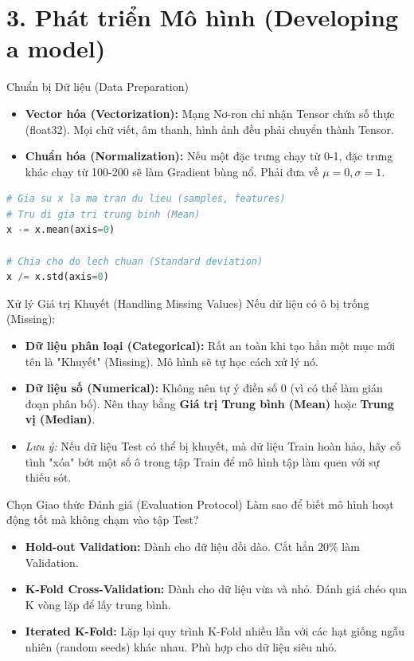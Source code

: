 \documentclass[aspectratio=169]{beamer}
\begin{document}
\section{3. Phát triển Mô hình (Developing a model)}

\begin{frame}[fragile]{Chuẩn bị Dữ liệu (Data Preparation)}
    \begin{itemize}
        \item \textbf{Vector hóa (Vectorization):} Mạng Nơ-ron chỉ nhận Tensor chứa số thực (float32). Mọi chữ viết, âm thanh, hình ảnh đều phải chuyển thành Tensor.
        \item \textbf{Chuẩn hóa (Normalization):} Nếu một đặc trưng chạy từ 0-1, đặc trưng khác chạy từ 100-200 sẽ làm Gradient bùng nổ. Phải đưa về $\mu=0, \sigma=1$.
    \end{itemize}
    
    \begin{lstlisting}[language=Python, caption=Cú pháp Chuẩn hóa cơ bản bằng NumPy]
# Gia su x la ma tran du lieu (samples, features)
# Tru di gia tri trung binh (Mean)
x -= x.mean(axis=0)

# Chia cho do lech chuan (Standard deviation)
x /= x.std(axis=0)
    \end{lstlisting}
\end{frame}

\begin{frame}{Xử lý Giá trị Khuyết (Handling Missing Values)}
    Nếu dữ liệu có ô bị trống (Missing):
    \begin{itemize}
        \item \textbf{Dữ liệu phân loại (Categorical):} Rất an toàn khi tạo hẳn một mục mới tên là "Khuyết" (Missing). Mô hình sẽ tự học cách xử lý nó.
        \item \textbf{Dữ liệu số (Numerical):} Không nên tự ý điền số 0 (vì có thể làm gián đoạn phân bố). Nên thay bằng \textbf{Giá trị Trung bình (Mean)} hoặc \textbf{Trung vị (Median)}.
        \item \textit{Lưu ý:} Nếu dữ liệu Test có thể bị khuyết, mà dữ liệu Train hoàn hảo, hãy cố tình "xóa" bớt một số ô trong tập Train để mô hình tập làm quen với sự thiếu sót.
    \end{itemize}
\end{frame}

\begin{frame}{Chọn Giao thức Đánh giá (Evaluation Protocol)}
    Làm sao để biết mô hình hoạt động tốt mà không chạm vào tập Test?
    \begin{itemize}
        \item \textbf{Hold-out Validation:} Dành cho dữ liệu dồi dào. Cắt hẳn $20\%$ làm Validation.
        \item \textbf{K-Fold Cross-Validation:} Dành cho dữ liệu vừa và nhỏ. Đánh giá chéo qua K vòng lặp để lấy trung bình.
        \item \textbf{Iterated K-Fold:} Lặp lại quy trình K-Fold nhiều lần với các hạt giống ngẫu nhiên (random seeds) khác nhau. Phù hợp cho dữ liệu siêu nhỏ.
    \end{itemize}
\end{frame}
\end{document}
